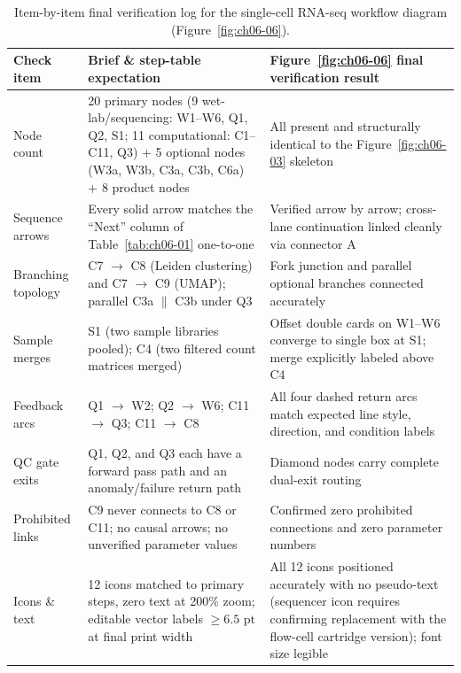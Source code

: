 \begin{table}[htbp]\centering\footnotesize
\setlength{\tabcolsep}{4pt}
\renewcommand{\arraystretch}{1.12}
\caption{Item-by-item final verification log for the single-cell RNA-seq workflow diagram (Figure~\ref{fig:ch06-06}).}\label{tab:ch06-04}
\begin{tabularx}{\linewidth}{@{}>{\raggedright\arraybackslash}p{24mm}YY@{}}
\toprule
\textbf{Check item} & \textbf{Brief \& step-table expectation} & \textbf{Figure~\ref{fig:ch06-06} final verification result} \\
\midrule
Node count & 20 primary nodes (9 wet-lab/sequencing: W1--W6, Q1, Q2, S1; 11 computational: C1--C11, Q3) + 5 optional nodes (W3a, W3b, C3a, C3b, C6a) + 8 product nodes & All present and structurally identical to the Figure~\ref{fig:ch06-03} skeleton \\
Sequence arrows & Every solid arrow matches the ``Next'' column of Table~\ref{tab:ch06-01} one-to-one & Verified arrow by arrow; cross-lane continuation linked cleanly via connector A \\
Branching topology & C7 $\rightarrow$ C8 (Leiden clustering) and C7 $\rightarrow$ C9 (UMAP); parallel C3a $\parallel$ C3b under Q3 & Fork junction and parallel optional branches connected accurately \\
Sample merges & S1 (two sample libraries pooled); C4 (two filtered count matrices merged) & Offset double cards on W1--W6 converge to single box at S1; merge explicitly labeled above C4 \\
Feedback arcs & Q1 $\rightarrow$ W2; Q2 $\rightarrow$ W6; C11 $\rightarrow$ Q3; C11 $\rightarrow$ C8 & All four dashed return arcs match expected line style, direction, and condition labels \\
QC gate exits & Q1, Q2, and Q3 each have a forward pass path and an anomaly/failure return path & Diamond nodes carry complete dual-exit routing \\
Prohibited links & C9 never connects to C8 or C11; no causal arrows; no unverified parameter values & Confirmed zero prohibited connections and zero parameter numbers \\
Icons \& text & 12 icons matched to primary steps, zero text at 200\% zoom; editable vector labels $\ge 6.5\text{ pt}$ at final print width & All 12 icons positioned accurately with no pseudo-text (sequencer icon requires confirming replacement with the flow-cell cartridge version); font size legible \\
\bottomrule
\end{tabularx}
\end{table}

